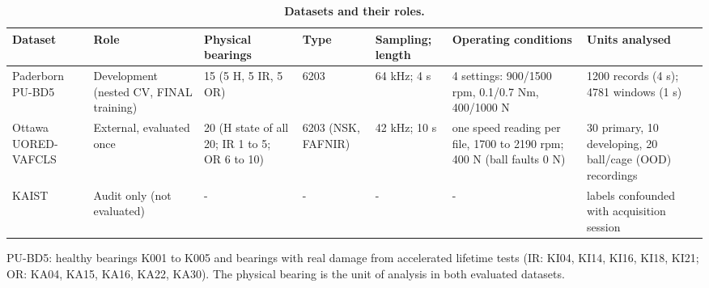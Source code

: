 \begin{table}[!ht]
\centering
\caption{\textbf{Datasets and their roles.}}
{\footnotesize
\begin{tabular}{|p{1.5cm}|p{1.9cm}|p{1.9cm}|p{1.2cm}|p{1.2cm}|p{2.6cm}|p{2.3cm}|}
\hline
Dataset & Role & Physical bearings & Type & Sampling; length & Operating conditions & Units analysed \\ \hline
Paderborn PU-BD5 & Development (nested CV, FINAL training) & 15 (5 H, 5 IR, 5 OR) & 6203 & 64 kHz; 4 s & 4 settings: 900/1500 rpm, 0.1/0.7 Nm, 400/1000 N & 1200 records (4 s); 4781 windows (1 s) \\ \hline
Ottawa UORED-VAFCLS & External, evaluated once & 20 (H state of all 20; IR 1 to 5; OR 6 to 10) & 6203 (NSK, FAFNIR) & 42 kHz; 10 s & one speed reading per file, 1700 to 2190 rpm; 400 N (ball faults 0 N) & 30 primary, 10 developing, 20 ball/cage (OOD) recordings \\ \hline
KAIST & Audit only (not evaluated) & - & - & - & - & labels confounded with acquisition session \\ \hline
\end{tabular}}
\begin{flushleft} PU-BD5: healthy bearings K001 to K005 and bearings with real damage from accelerated lifetime tests (IR: KI04, KI14, KI16, KI18, KI21; OR: KA04, KA15, KA16, KA22, KA30). The physical bearing is the unit of analysis in both evaluated datasets. \end{flushleft}
\label{tab:datasets}
\end{table}